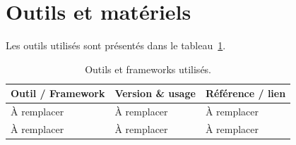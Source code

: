 \section{Outils et matériels}

Les outils utilisés sont présentés dans le tableau~\ref{tab:outils}.

\begin{table}[H]
	\centering
	\begin{tabular}{lll}
		\hline
		\textbf{Outil / Framework} & \textbf{Version \& usage} & \textbf{Référence / lien} \\
		\hline
		À remplacer & À remplacer & À remplacer \\
		À remplacer & À remplacer & À remplacer \\
		\hline
	\end{tabular}
	\caption{Outils et frameworks utilisés.}
	\label{tab:outils}
\end{table}
